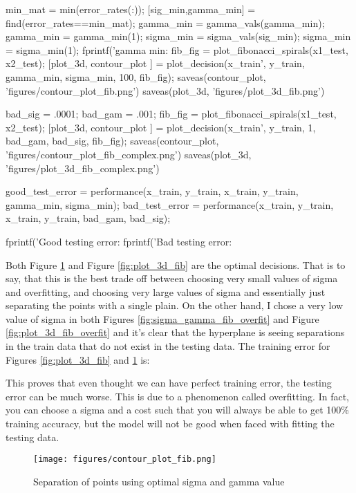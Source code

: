 \documentclass[11pt, twoside]{article}   	%
\newenvironment{matlab}{\comment}{\endcomment}
\begin{document}
\begin{matlab}
min_mat = min(error_rates(:));
[sig_min,gamma_min] = find(error_rates==min_mat);
gamma_min = gamma_vals(gamma_min);
gamma_min = gamma_min(1); 
sigma_min = sigma_vals(sig_min);
sigma_min = sigma_min(1); 
fprintf('gamma min: %
fib_fig = plot_fibonacci_spirals(x1_test, x2_test); 
[plot_3d, contour_plot ] = plot_decision(x_train', y_train, gamma_min, sigma_min, 100, fib_fig);
saveas(contour_plot, 'figures/contour_plot_fib.png')
saveas(plot_3d, 'figures/plot_3d_fib.png')

bad_sig = .0001;
bad_gam = .001;
fib_fig = plot_fibonacci_spirals(x1_test, x2_test);
[plot_3d, contour_plot ] = plot_decision(x_train', y_train, 1, bad_gam, bad_sig, fib_fig);
saveas(contour_plot, 'figures/contour_plot_fib_complex.png')
saveas(plot_3d, 'figures/plot_3d_fib_complex.png')

good_test_error = performance(x_train, y_train, x_train, y_train, gamma_min, sigma_min);
bad_test_error = performance(x_train, y_train, x_train, y_train, bad_gam, bad_sig);

fprintf('Good testing error: %
fprintf('Bad testing error: %

\end{matlab}

Both Figure \ref{fig:sigma_gamma_fib} and Figure \ref{fig:plot_3d_fib} are
the optimal decisions. That is to say, that this is the best trade off
between choosing very small values of sigma and overfitting, and choosing
very large values of sigma and essentially just separating the points with
a single plain. On the other hand, I chose a very low value of sigma in
both Figures \ref{fig:sigma_gamma_fib_overfit} and Figure
\ref{fig:plot_3d_fib_overfit} and it's clear that the hyperplane is seeing
separations in the train data that do not exist in the testing data.  The training error
for Figures \ref{fig:plot_3d_fib} and \ref{fig:sigma_gamma_fib} is:

\color{lightgray}
\color{black}

This proves that even thought we can have perfect training error, the testing
error can be much worse. This is due to a phenomenon called overfitting. In fact, 
you can choose a sigma and a cost such that you will always be able to get 
100\% training accuracy, but the model will not be good when faced with fitting
the testing data. 

\begin{figure}[h]
\centering
\texttt{[image: figures/contour\_plot\_fib.png]}
\caption{Separation of points using optimal sigma and gamma value}
\label{fig:sigma_gamma_fib} 
\end{figure}
\end{document}
